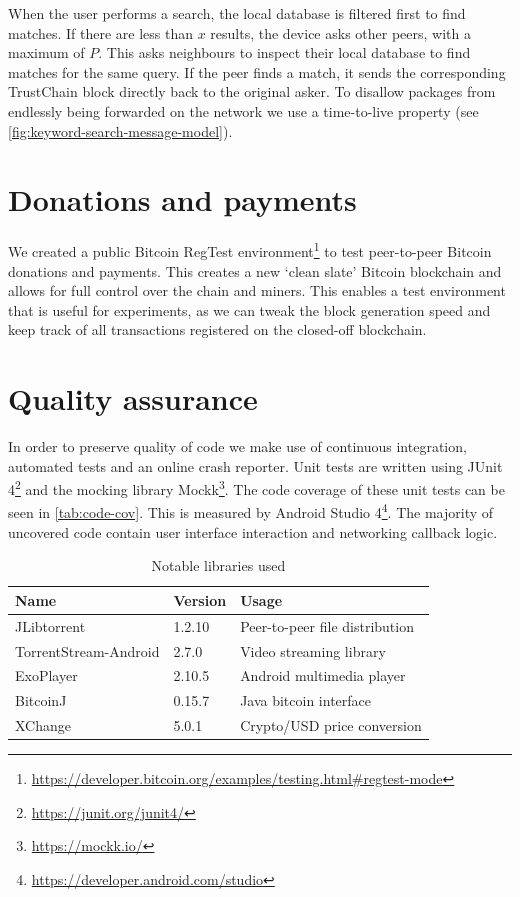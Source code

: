When the user performs a search, the local database is filtered first to find matches. If there are less than \(x\) results, the device asks other peers, with a maximum of \(P\). This asks neighbours to inspect their local database to find matches for the same query. If the peer finds a match, it sends the corresponding TrustChain block directly back to the original asker. To disallow packages from endlessly being forwarded on the network we use a time-to-live property (see \ref{fig:keyword-search-message-model}).

\section{Donations and payments}
\label{sec:regtest-network-impl}
We created a public Bitcoin RegTest environment\footnote{\url{https://developer.bitcoin.org/examples/testing.html\#regtest-mode}} to test peer-to-peer Bitcoin donations and payments. This creates a new `clean slate' Bitcoin blockchain and allows for full control over the chain and miners. This enables a test environment that is useful for experiments, as we can tweak the block generation speed and keep track of all transactions registered on the closed-off blockchain.

\section{Quality assurance}
In order to preserve quality of code we make use of continuous integration, automated tests and an online crash reporter. Unit tests are written using JUnit 4\footnote{\url{https://junit.org/junit4/}} and the mocking library Mockk\footnote{\url{https://mockk.io/}}. The code coverage of these unit tests can be seen in \ref{tab:code-cov}. This is measured by Android Studio 4\footnote{\url{https://developer.android.com/studio}}. The majority of uncovered code contain user interface interaction and networking callback logic. 

\begin{table}[]
\begin{tabular}{|l|l|l|}
\hline
Name                  & Version & Usage                          \\ \hline
JLibtorrent           & 1.2.10  & Peer-to-peer file distribution \\ \hline
TorrentStream-Android & 2.7.0   & Video streaming library        \\ \hline
ExoPlayer             & 2.10.5  & Android multimedia player      \\ \hline
BitcoinJ              & 0.15.7  & Java bitcoin interface         \\ \hline
XChange               & 5.0.1   & Crypto/USD price conversion    \\ \hline
\end{tabular}
\caption{Notable libraries used}
\label{tab:library-usage}
\end{table}

